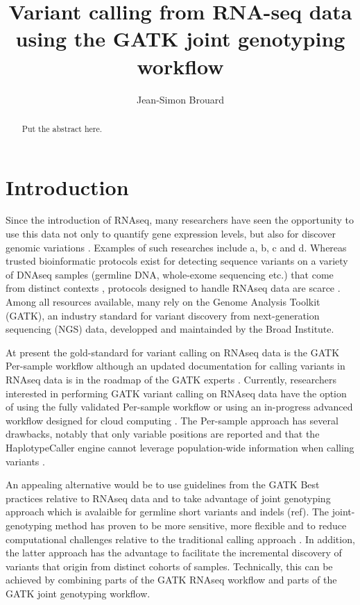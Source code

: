 \documentclass[]{article}
\title{Variant calling from RNA-seq data using the GATK joint genotyping workflow}
\author{Jean-Simon Brouard}
\begin{document}
\maketitle

\begin{abstract}
Put the abstract here.
\end{abstract}

\section{Introduction}
Since the introduction of RNAseq, many researchers have seen the opportunity to use this data not only to quantify gene expression levels, but also for discover genomic variations \cite{Piskol2013}. Examples of such researches include a, b, c and d. Whereas trusted bioinformatic protocols exist for detecting sequence variants on a variety of DNAseq samples (germline DNA, whole-exome sequencing etc.) that come from distinct contexts \cite{Koboldt2020}, protocols designed to handle RNAseq data are scarce \cite{Piskol2013}. Among all resources available, many rely on the Genome Analysis Toolkit (GATK), an industry standard for variant discovery from next-generation sequencing (NGS) data, developped and maintainded by the Broad Institute.


At present the gold-standard for variant calling on RNAseq data is the GATK Per-sample workflow although an updated documentation for calling variants in RNAseq data is in the roadmap of the GATK experts \cite{GATK_best_RNAseq}. Currently, researchers interested in performing GATK variant calling on RNAseq data have the option of using the fully validated Per-sample workflow \cite{GATK_RNAseq_variant_discovery} or using an in-progress advanced workflow designed for cloud computing \cite{GATK_gatk4_rnaseq_github}. The Per-sample approach has several drawbacks, notably that only variable positions are reported and that the HaplotypeCaller engine cannot leverage population-wide information when calling variants \cite{Brouard2019, GATK_RNAseq_variant_discovery}.

An appealing alternative would be to use guidelines from the GATK Best practices relative to RNAseq data and to take advantage of joint genotyping approach which is avalaible for germline short variants and indels (ref). The joint-genotyping method has proven to be more sensitive, more flexible and to reduce computational challenges relative to the traditional calling approach \cite{GATK_jointCalling_1}. In addition, the latter approach has the advantage to facilitate the incremental discovery of variants that origin from distinct cohorts of samples. Technically, this can be achieved by combining parts of the GATK RNAseq workflow and parts of the GATK joint genotyping workflow.
\end{document}
